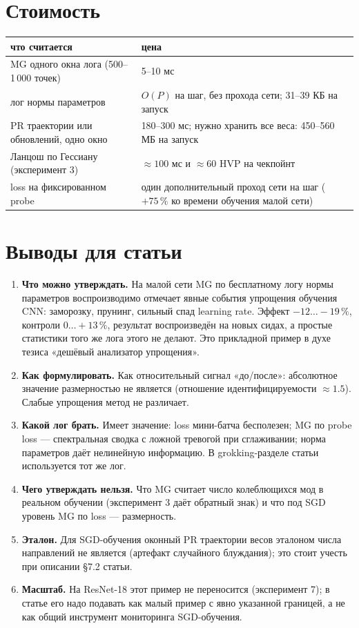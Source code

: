 \documentclass[10pt,a4paper]{article}
\begin{document}
\section{Стоимость}

\begin{center}\small
\begin{tabular}{p{6.2cm}p{9.8cm}}\toprule
что считается & цена\\\midrule
MG одного окна лога (500--1\,000 точек) & 5--10 мс\\
лог нормы параметров & $O(P)$ на шаг, без прохода сети; 31--39 КБ на запуск\\
PR траектории или обновлений, одно окно & 180--300 мс; нужно хранить все веса: 450--560 МБ на запуск\\
Ланцош по Гессиану (эксперимент 3) & $\approx 100$ мс и $\approx 60$ HVP на чекпойнт\\
loss на фиксированном probe & один дополнительный проход сети на шаг ($+75\,\%$ ко времени обучения малой сети)\\
\bottomrule\end{tabular}
\end{center}

\section{Выводы для статьи}

\begin{enumerate}\setlength\itemsep{2pt}
\item \textbf{Что можно утверждать.} На малой сети MG по бесплатному логу нормы параметров
  воспроизводимо отмечает явные события упрощения обучения CNN: заморозку,
  прунинг, сильный спад learning rate. Эффект $-12\ldots-19\,\%$, контроли
  $0\ldots+13\,\%$, результат воспроизведён на новых сидах, а простые статистики
  того же лога этого не делают. Это прикладной пример в духе тезиса «дешёвый
  анализатор упрощения».
\item \textbf{Как формулировать.} Как относительный сигнал «до/после»: абсолютное
  значение размерностью не является (отношение идентифицируемости $\approx 1.5$).
  Слабые упрощения метод не различает.
\item \textbf{Какой лог брать.} Имеет значение: loss мини-батча бесполезен; MG по
  probe loss --- спектральная сводка с ложной тревогой при сглаживании; норма
  параметров даёт нелинейную информацию. В grokking-разделе статьи используется
  тот же лог.
\item \textbf{Чего утверждать нельзя.} Что MG считает число колеблющихся мод в
  реальном обучении (эксперимент 3 даёт обратный знак) и что под SGD уровень MG
  по loss --- размерность.
\item \textbf{Эталон.} Для SGD-обучения оконный PR траектории весов эталоном
  числа направлений не является (артефакт случайного блуждания); это стоит учесть
  при описании §7.2 статьи.
\item \textbf{Масштаб.} На ResNet-18 этот пример не переносится (эксперимент 7);
  в статье его надо подавать как малый пример с явно указанной границей, а не
  как общий инструмент мониторинга SGD-обучения.
\end{enumerate}
\end{document}
